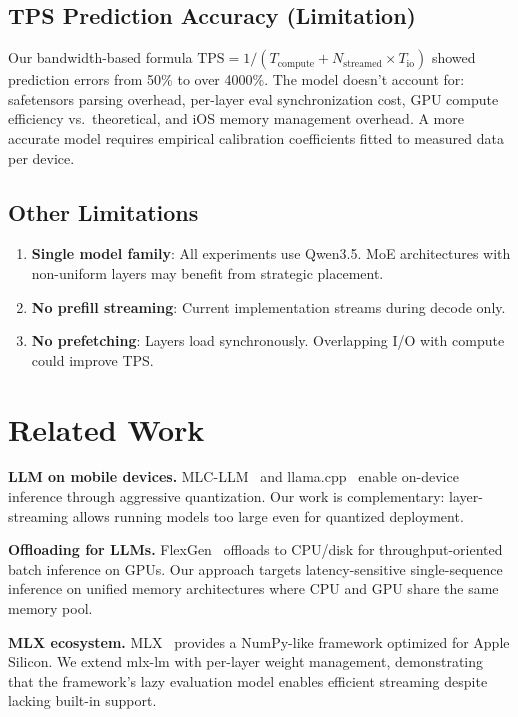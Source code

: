 \documentclass[10pt,a4paper]{article}
\begin{document}
\subsection{TPS Prediction Accuracy (Limitation)}

Our bandwidth-based formula $\text{TPS} = 1 / (T_{\text{compute}} + N_{\text{streamed}} \times T_{\text{io}})$ showed prediction errors from 50\% to over 4000\%. The model doesn't account for: safetensors parsing overhead, per-layer eval synchronization cost, GPU compute efficiency vs.\ theoretical, and iOS memory management overhead. A more accurate model requires empirical calibration coefficients fitted to measured data per device.

\subsection{Other Limitations}

\begin{enumerate}
    \item \textbf{Single model family}: All experiments use Qwen3.5. MoE architectures with non-uniform layers may benefit from strategic placement.
    \item \textbf{No prefill streaming}: Current implementation streams during decode only.
    \item \textbf{No prefetching}: Layers load synchronously. Overlapping I/O with compute could improve TPS.
\end{enumerate}

\section{Related Work}

\textbf{LLM on mobile devices.} MLC-LLM~\cite{mlcllm} and llama.cpp~\cite{llamacpp} enable on-device inference through aggressive quantization. Our work is complementary: layer-streaming allows running models too large even for quantized deployment.

\textbf{Offloading for LLMs.} FlexGen~\cite{flexgen} offloads to CPU/disk for throughput-oriented batch inference on GPUs. Our approach targets latency-sensitive single-sequence inference on unified memory architectures where CPU and GPU share the same memory pool.

\textbf{MLX ecosystem.} MLX~\cite{mlx} provides a NumPy-like framework optimized for Apple Silicon. We extend mlx-lm with per-layer weight management, demonstrating that the framework's lazy evaluation model enables efficient streaming despite lacking built-in support.
\end{document}
